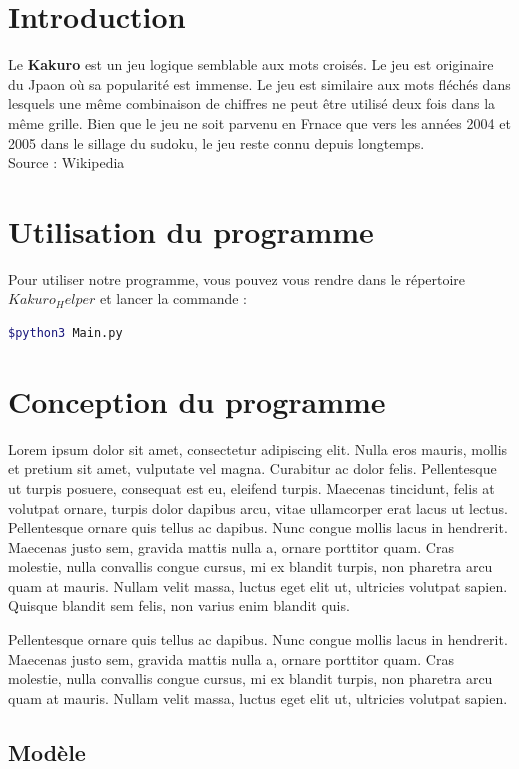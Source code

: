 \documentclass[12pt]{article}
\begin{document}
\tableofcontents
\newpage


\section{Introduction}
Le \textbf{Kakuro} est un jeu logique semblable aux mots croisés. Le jeu est originaire du Jpaon où sa popularité est immense. Le jeu est similaire aux mots fléchés dans lesquels une même combinaison de chiffres ne peut être utilisé deux fois dans la même grille. Bien que le jeu ne soit parvenu en Frnace que vers les années 2004 et 2005 dans le sillage du sudoku, le jeu reste connu depuis longtemps.  \\ Source : Wikipedia

\section{Utilisation du programme}
Pour utiliser notre programme, vous pouvez vous rendre dans le répertoire $Kakuro_Helper$ et lancer la commande :
\begin{lstlisting}[language=bash]
  $python3 Main.py
\end{lstlisting}


\section{Conception du programme}
Lorem ipsum dolor sit amet, consectetur adipiscing elit. Nulla eros mauris, mollis et pretium sit amet, vulputate vel magna. Curabitur ac dolor felis. Pellentesque ut turpis posuere, consequat est eu, eleifend turpis. Maecenas tincidunt, felis at volutpat ornare, turpis dolor dapibus arcu, vitae ullamcorper erat lacus ut lectus. Pellentesque ornare quis tellus ac dapibus. Nunc congue mollis lacus in hendrerit. Maecenas justo sem, gravida mattis nulla a, ornare porttitor quam. Cras molestie, nulla convallis congue cursus, mi ex blandit turpis, non pharetra arcu quam at mauris. Nullam velit massa, luctus eget elit ut, ultricies volutpat sapien. Quisque blandit sem felis, non varius enim blandit quis.

Pellentesque ornare quis tellus ac dapibus. Nunc congue mollis lacus in hendrerit. Maecenas justo sem, gravida mattis nulla a, ornare porttitor quam. Cras molestie, nulla convallis congue cursus, mi ex blandit turpis, non pharetra arcu quam at mauris. Nullam velit massa, luctus eget elit ut, ultricies volutpat sapien.
\subsection{Modèle}
\end{document}
